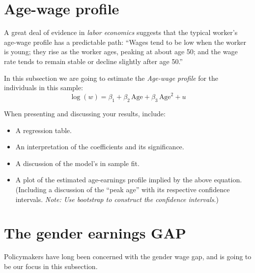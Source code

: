 \documentclass[12pt,a4paper,onecolumn]{article}
\begin{document}
\section{Age-wage profile}

A great deal of evidence in \emph{labor economics} suggests that the typical worker's age-wage profile has a predictable path: ``Wages tend to be low when the worker is young; they rise as the worker ages, peaking at about age 50; and the wage rate tends to remain stable or decline slightly after age 50.''

In this subsection we are going to estimate the \emph{Age-wage profile} for the individuals in this sample:
\begin{equation}
\log(w) = \beta_1 + \beta_2 \,\text{Age} + \beta_3 \,\text{Age}^2 + u
\end{equation}

When presenting and discussing your results, include:
\begin{itemize}
  \item A regression table.
  \item An interpretation of the coefficients and its significance.
  \item A discussion of the model's in sample fit.
  \item A plot of the estimated age-earnings profile implied by the above equation. (Including a discussion of the ``peak age'' with its respective confidence intervals. \textit{Note: Use bootstrap to construct the confidence intervals}.)
\end{itemize}

\section{The gender earnings GAP}

Policymakers have long been concerned with the gender wage gap, and is going to be our focus in this subsection.
\end{document}
